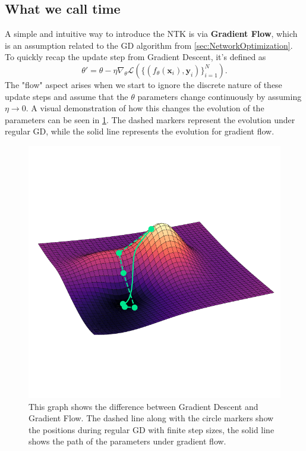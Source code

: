\subsection{What we call time}
A simple and intuitive way to introduce the NTK is via \textbf{Gradient Flow}, which is an assumption related to the GD algorithm from \cref{sec:NetworkOptimization}. To quickly recap the update step from Gradient Descent, it's defined as 
\begin{equation}
	\theta' = \theta - \eta \nabla_\theta \mathscr{L}\left( \{(f_\theta(\mathbf{x}_i), \mathbf{y}_i)\}_{i=1}^{N} \right).
\end{equation}
The "flow" aspect arises when we start to ignore the discrete nature of these update steps and assume that the $\theta$ parameters change continuously by assuming $\eta \rightarrow 0$. A visual demonstration of how this changes the evolution of the parameters can be seen in \cref{fig:GradientFlowPlot}. The dashed markers represent the evolution under regular GD, while the solid line represents the evolution for gradient flow.
\begin{figure}
	\centering
	\includegraphics[width=12cm, clip, trim = 0cm 2.3cm 0cm 3.5cm]{text/NTK/GradientFlowPlot.pdf}
	\caption{This graph shows the difference between Gradient Descent and Gradient Flow. The dashed line along with the circle markers show the positions during regular GD with finite step sizes, the solid line shows the path of the parameters under gradient flow.}
	\label{fig:GradientFlowPlot}
\end{figure}
